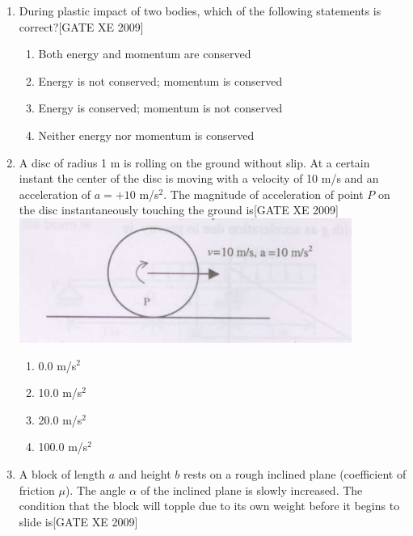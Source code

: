 \documentclass[journal,12pt,onecolumn]{IEEEtran}
\theoremstyle{remark}
\begin{document}
\begin{enumerate}
\item During plastic impact of two bodies, which of the following statements is correct?\hfill[GATE XE 2009]\\
\begin{multicols}{2}
\begin{enumerate}
    \item Both energy and momentum are conserved
    \item Energy is not conserved; momentum is conserved
    \item Energy is conserved; momentum is not conserved
    \item Neither energy nor momentum is conserved
\end{enumerate}
\end{multicols}




\item A disc of radius 1 m is rolling on the ground without slip. At a certain instant the center of the disc is moving with a velocity of 10 m/s and an acceleration of $a = + 10$ m/s$^2$. The magnitude of acceleration of point $P$ on the disc instantaneously touching the ground is\hfill[GATE XE 2009]\\

   \includegraphics[width=0.5\columnwidth]{figs/fig10.png}



\begin{multicols}{2}
\begin{enumerate}
    \item 0.0 m/s$^2$
    \item 10.0 m/s$^2$
    \item 20.0 m/s$^2$
    \item 100.0 m/s$^2$
\end{enumerate}
\end{multicols}



\item A block of length $a$ and height $b$ rests on a rough inclined plane (coefficient of friction $\mu$). The angle $\alpha$ of the inclined plane is slowly increased. The condition that the block will topple due to its own weight before it begins to slide is\hfill[GATE XE 2009]\\


\end{enumerate}
\end{document}
